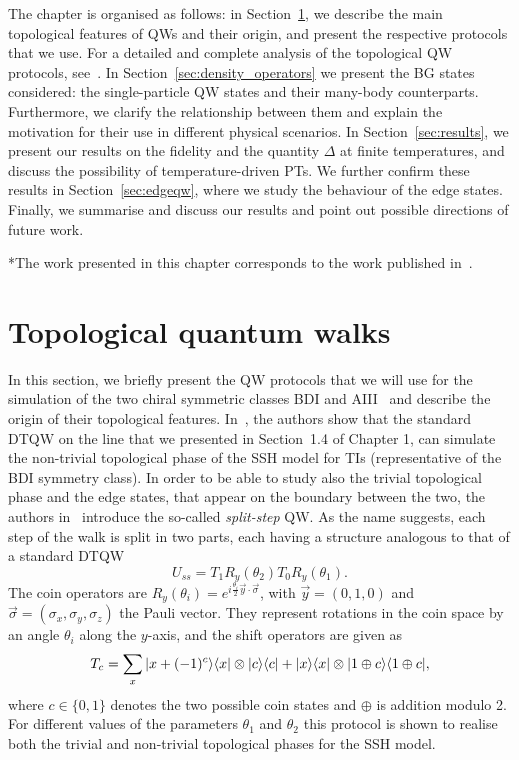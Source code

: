 The chapter is organised as follows: in Section~\ref{sec:top_qw}, we describe the main topological features of QWs and their origin, and present the respective protocols that we use. For a detailed and complete analysis of the topological QW protocols, see~\cite{kit:rud:ber:dem:10,kit:12}. In Section~\ref{sec:density_operators} we present the BG states considered: the single-particle QW states and their many-body counterparts. Furthermore, we clarify the relationship between them and explain the motivation for their use in different physical scenarios. In Section~\ref{sec:results}, we present our results on the fidelity and the quantity $\Delta$ at finite temperatures, and discuss the possibility of temperature-driven PTs. We further confirm these results in Section~\ref{sec:edgeqw}, where we study the behaviour of the edge states. Finally, we summarise and discuss our results and point out possible directions of future work.  
\vfill

\begin{center}
 *The work presented in this chapter corresponds to the work published in~\cite{mer:vla:pau:vie:17:qw}.
\end{center}

\newpage



\section{Topological quantum walks}
\label{sec:top_qw}
In this section, we briefly present the QW protocols that we will use for the simulation of the two chiral symmetric classes BDI and AIII~\cite{sch:ryu:fur:lud:08,kit:09} and describe the origin of their topological features. 
In~\cite{kit:rud:ber:dem:10}, the authors show that the standard DTQW  on the line that we presented in Section~1.4 of Chapter 1, can simulate the non-trivial topological phase of the SSH model for TIs (representative of the BDI symmetry class). In order to be able to study also the trivial topological phase and the edge states, that appear on the boundary between the two, the authors in~\cite{kit:rud:ber:dem:10} introduce the so-called \textit{split-step} QW. As the name suggests, each step of the walk is split in two parts, each having a structure analogous to that of a standard DTQW
\begin{equation}
U_{ss}=T_1R_{y}(\theta_2)T_0R_{y}(\theta_1).
\label{eq:split}
\end{equation}
The coin operators are $R_{y}(\theta_i) = e^{i\frac{\theta_i}{2}\vec{y} \cdot \vec\sigma}$, with $\vec{y}=(0,1,0)$ and $\vec\sigma =(\sigma_x , \sigma_y , \sigma_z)$ the Pauli vector. They represent rotations in the coin space by an angle $\theta_i$ along the $y$-axis, and the shift operators are given as
\begin{equation}
T_{c}=\sum_{x}| x+(-1)^c \rangle\langle x |\otimes| c \rangle\langle c |+| x \rangle\langle x |\otimes| 1\oplus c \rangle\langle 1\oplus c |,
\end{equation}
where $c\in\{ 0,1\}$ denotes the two possible coin states and $\oplus$ is addition modulo 2.
For different values of the parameters $\theta_1$ and $\theta_2$ this protocol is shown to realise both the trivial and non-trivial topological phases for the SSH model.

